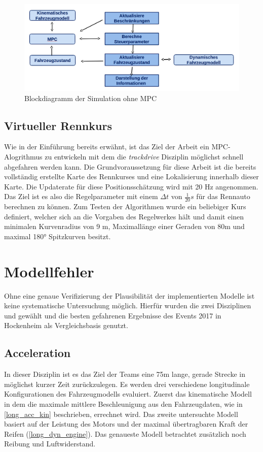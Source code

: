 \documentclass{like}
\begin{document}
\begin{figure}[ht!]
	\centering
	\includegraphics[width=350pt]{Abbildungen/sim_for_loop.png}
	\caption{Blockdiagramm der Simulation ohne MPC}
	\label{fig:block_diagram_sim}
\end{figure}


\section{Virtueller Rennkurs}
Wie in der Einführung bereits erwähnt, ist das Ziel der Arbeit ein \ac{MPC}-Alogrithmus zu entwickeln mit dem die \emph{trackdrive} Disziplin möglichst schnell abgefahren werden kann. Die Grundvoraussetzung für diese Arbeit ist die bereits vollständig erstellte Karte des Rennkurses und eine Lokalisierung innerhalb dieser Karte. Die Updaterate für diese Positionsschätzung wird mit 20 Hz angenommen. Das Ziel ist es also die Regelparameter mit einem $\Delta t$ von $\frac{1}{20} s$ für das Rennauto berechnen zu können.  Zum Testen der Algorithmen wurde ein beliebiger Kurs definiert, welcher sich an die Vorgaben des Regelwerkes hält und damit einen minimalen Kurvenradius von 9 m, Maximallänge einer Geraden von 80m und maximal 180° Spitzkurven besitzt.

\chapter{Modellfehler}
\label{modelError}
Ohne eine genaue Verifizierung der Plausibilität der implementierten Modelle ist keine systematische Untersuchung möglich. Hierfür wurden die zwei Disziplinen  und  gewählt und die besten gefahrenen Ergebnisse des Events 2017 in Hockenheim als Vergleichsbasis genutzt.


\section{Acceleration}
In dieser Disziplin ist es das Ziel der Teams eine 75m lange, gerade Strecke in möglichst kurzer Zeit zurückzulegen.
Es werden drei verschiedene longitudinale Konfigurationen des Fahrzeugmodells evaluiert. Zuerst das kinematische Modell in dem die maximale mittlere Beschleunigung aus den Fahrzeugdaten, wie in \ref{long_acc_kin} beschrieben, errechnet wird. Das zweite untersuchte Modell basiert auf der Leistung des Motors und der maximal übertragbaren Kraft der Reifen (\ref{long_dyn_engine}).
Das genaueste Modell betrachtet zusätzlich noch Reibung und Luftwiderstand. 
\end{document}
